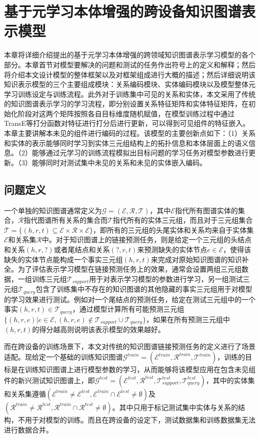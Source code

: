 \chapter{基于元学习本体增强的跨设备知识图谱表示模型}
本章将详细介绍提出的基于元学习本体增强的跨领域知识图谱表示学习模型的各个部分。本章首节对模型要解决的问题和测试的任务作出符号上的定义和解释；然后将介绍本文设计模型的整体框架以及对框架组成进行大概的描述；然后详细说明该知识表示模型的三个主要组成模块：关系编码模块、实体编码模块以及模型整体元学习训练设定与训练流程。此外对于训练集中可见的关系和实体，本文采用了传统的知识图谱表示学习的学习流程，即分别设置关系特征矩阵和实体特征矩阵，在初始化阶段对这两个矩阵按照各自目标维度随机赋值，在模型训练过程中通过TransE等打分函数对特征进行打分后进行更新，可以得到可见组件的特征嵌入。本章主要讲解本未见的组件进行编码的过程。该模型的主要创新点如下：（1）关系和实体的表示能够同时学习到实体三元组结构上的拓扑信息和本体层面上的语义信息。（2）能够通过元学习的训练流程模拟出目标问题的学习任务对模型参数进行更新。（3）能够同时对测试集中未见的关系和未见的实体嵌入编码。
\section{问题定义}
一个单独的知识图谱通常定义为\(\mathcal{G} = (\mathcal{E},\mathcal{R},\mathcal{T})\)，其中\(\mathcal{E}\)指代所有图谱实体的集合，\(\mathcal{R}\)指代图谱所有关系的集合而\(\mathcal{T}\)指代所有的实体三元组，而且对于三元组集合\(\mathcal{T}=\{(h,r,t) \subseteq \mathcal{E} \times \mathcal{R} \times \mathcal{E}\}\)，即所有的三元组的头尾实体和关系均来自于实体集\(\mathcal{E}\)和关系集\(\mathcal{R}\)中。对于知识图谱上的链接预测任务，则是给定一个三元组的头结点和关系\((h,r,?)\)或者尾结点和关系\((?,r,t)\)来预测缺失的实体节点\(e \in \mathcal{E}\)，使得该缺失的实体节点能构成一个事实三元组\((h,r,t)\)来完成对原始知识图谱的知识补全。为了评估表示学习模型在链接预测任务上的效果，通常会设置两组三元组数据，一组训练三元组\(\mathcal{T}_{support}\)用于对表示学习模型的参数进行学习，另一组测试三元组\(\mathcal{T}_{query}\)包含了训练集中不存在的知识图谱的其他隐藏的事实三元组用于对模型的学习效果进行测试。例如对一个尾结点的预测任务，给定在测试三元组中的一个事实\((h,r,t) \in \mathcal{T}_{query}\)，通过模型计算所有可能预测三元组\(\{(h,r,e) | e \in \mathcal{E}, (h,r,e) \notin \mathcal{T}_{support} \cup \mathcal{T}_{query}\}\)，如果在所有预测三元组中\((h,r,t)\)的得分越高则说明该表示模型的效果越好。

而在跨设备的训练场景下，本文对传统的知识图谱链接预测任务的定义进行了场景适配。现给定一个基础的训练知识图谱\(\mathcal{G}^{train} = (\mathcal{E}^{train},\mathcal{R}^{train},\mathcal{T}^{train})\)，训练的目标是在训练知识图谱上进行模型参数的学习，从而能够将该模型应用在包含未见组件的新兴测试知识图谱上，即\(\mathcal{G}^{test} = (\mathcal{E}^{test},\mathcal{R}^{test},\mathcal{T}^{test}_{support},\mathcal{T}^{test}_{query})\)，其中的实体集和关系集遵循\((\mathcal{E}^{train} \neq \mathcal{E}^{test},\mathcal{E}^{train} \cap \mathcal{E}^{test} \neq \emptyset)\)及\((\mathcal{R}^{train} \neq \mathcal{R}^{test},\mathcal{R}^{train} \cap \mathcal{R}^{test} \neq \emptyset)\)。其中只用于标记测试集中实体与关系的结构，不用于对模型的训练。而且在跨设备的设定下，测试数据集和训练数据集无法进行数据合并。
